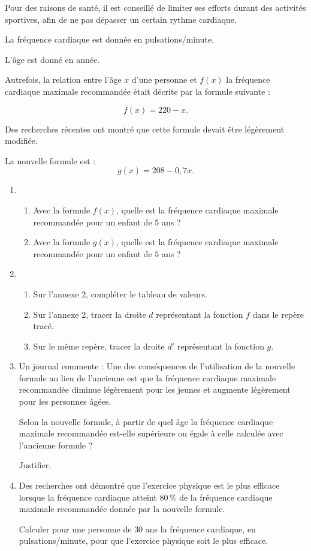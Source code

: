 
\medskip

Pour des raisons de santé, il est conseillé de limiter ses efforts durant des activités sportives, afin de ne pas dépasser un certain rythme cardiaque.

La fréquence cardiaque est donnée en pulsations/minute.

L'âge est donné en année.

\smallskip

Autrefois, la relation entre l'âge $x$ d'une personne et $f(x)$ la fréquence cardiaque maximale recommandée était décrite par la formule suivante :

\[f(x) = 220 - x.\]

Des recherches récentes ont montré que cette formule devait être légèrement modifiée.

La nouvelle formule est :
\[g(x) = 208 - 0,7x.\]

\begin{enumerate}
\item 
	\begin{enumerate}
		\item Avec la formule $f(x)$, quelle est la fréquence cardiaque maximale recommandée pour un enfant de $5$ ans ?
		\item Avec la formule $g(x)$, quelle est la fréquence cardiaque maximale recommandée pour un enfant de $5$ ans ?
	\end{enumerate}
\item  
	\begin{enumerate}
		\item Sur l'annexe 2, compléter le tableau de valeurs.
		\item Sur l'annexe 2, tracer la droite $d$ représentant la fonction $f$ dans le repère tracé.
		\item Sur le même repère, tracer la droite $d'$ représentant la fonction $g$.
	\end{enumerate}
\item  Un journal commente : \og Une des conséquences de l'utilisation de la nouvelle formule au lieu de l'ancienne est que la fréquence cardiaque maximale recommandée diminue
légèrement pour les jeunes et augmente légèrement pour les personnes âgées. \fg
	
Selon la nouvelle formule, à partir de quel âge la fréquence cardiaque maximale
recommandée est-elle supérieure ou égale à celle calculée avec l'ancienne formule ?
	
Justifier.
\item  Des recherches ont démontré que l'exercice physique est le plus efficace lorsque la
fréquence cardiaque atteint 80\,\% de la fréquence cardiaque maximale recommandée
donnée par la nouvelle formule.
	
Calculer pour une personne de $30$ ans la fréquence cardiaque, en pulsations/minute, pour
que l'exercice physique soit le plus efficace.
\end{enumerate}

